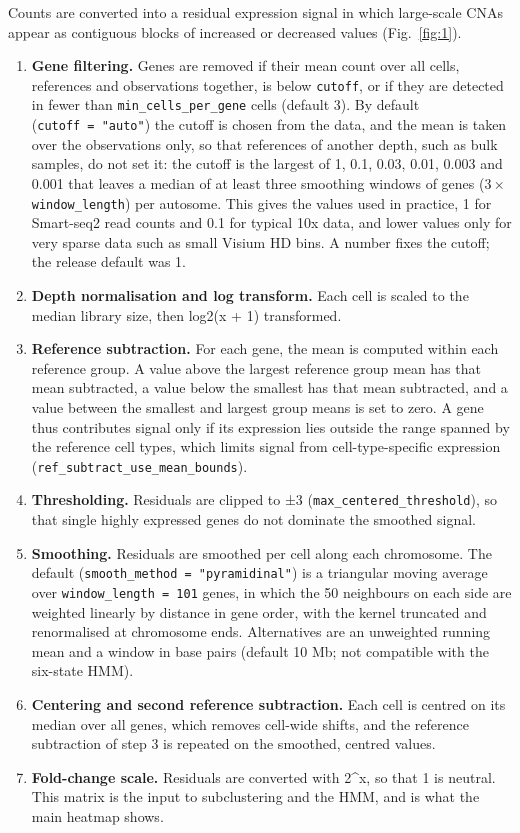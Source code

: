 Counts are converted into a residual expression signal in which large-scale CNAs appear as contiguous blocks of increased or decreased values (Fig.~\ref{fig:1}).

\begin{enumerate}
\def\labelenumi{\arabic{enumi}.}
\tightlist
\item
  \textbf{Gene filtering.} Genes are removed if their mean count over all cells, references and observations together, is below \texttt{cutoff}, or if they are detected in fewer than \texttt{min\_cells\_per\_gene} cells (default 3). By default (\texttt{cutoff\ =\ "auto"}) the cutoff is chosen from the data, and the mean is taken over the observations only, so that references of another depth, such as bulk samples, do not set it: the cutoff is the largest of 1, 0.1, 0.03, 0.01, 0.003 and 0.001 that leaves a median of at least three smoothing windows of genes ($3\times$\texttt{window\_length}) per autosome. This gives the values used in practice, 1 for Smart-seq2 read counts and 0.1 for typical 10x data, and lower values only for very sparse data such as small Visium HD bins. A number fixes the cutoff; the release default was 1.
\item
  \textbf{Depth normalisation and log transform.} Each cell is scaled to the median library size, then log2(x + 1) transformed.
\item
  \textbf{Reference subtraction.} For each gene, the mean is computed within each reference group. A value above the largest reference group mean has that mean subtracted, a value below the smallest has that mean subtracted, and a value between the smallest and largest group means is set to zero. A gene thus contributes signal only if its expression lies outside the range spanned by the reference cell types, which limits signal from cell-type-specific expression (\texttt{ref\_subtract\_use\_mean\_bounds}).
\item
  \textbf{Thresholding.} Residuals are clipped to ±3 (\texttt{max\_centered\_threshold}), so that single highly expressed genes do not dominate the smoothed signal.
\item
  \textbf{Smoothing.} Residuals are smoothed per cell along each chromosome. The default (\texttt{smooth\_method\ =\ "pyramidinal"}) is a triangular moving average over \texttt{window\_length\ =\ 101} genes, in which the 50 neighbours on each side are weighted linearly by distance in gene order, with the kernel truncated and renormalised at chromosome ends. Alternatives are an unweighted running mean and a window in base pairs (default 10 Mb; not compatible with the six-state HMM).
\item
  \textbf{Centering and second reference subtraction.} Each cell is centred on its median over all genes, which removes cell-wide shifts, and the reference subtraction of step 3 is repeated on the smoothed, centred values.
\item
  \textbf{Fold-change scale.} Residuals are converted with 2\^{}x, so that 1 is neutral. This matrix is the input to subclustering and the HMM, and is what the main heatmap shows.
\end{enumerate}

